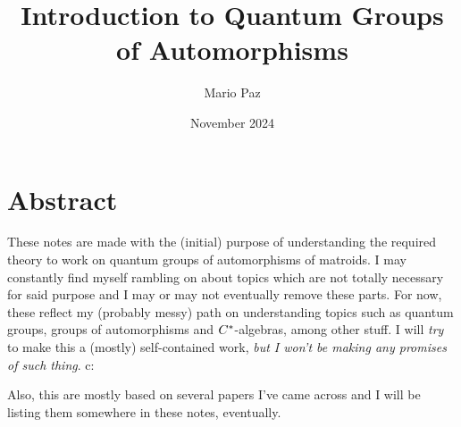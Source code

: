 \documentclass{book}
\title{Introduction to Quantum Groups of Automorphisms}
\author{Mario Paz}
\date{November 2024}
\begin{document}
\maketitle
\tableofcontents

\chapter*{Abstract}
These notes are made with the (initial) purpose of understanding the required theory to work on quantum groups of automorphisms of matroids. I may constantly find myself rambling on about topics which are not totally necessary for said purpose and I may or may not eventually remove these parts. For now, these reflect my (probably messy) path on understanding topics such as quantum groups, groups of automorphisms and $C^{*}$-algebras, among other stuff. I will \emph{try} to make this a (mostly) self-contained work, \emph{but I won't be making any promises of such thing}. c:

Also, this are mostly based on several papers I've came across and I will be listing them somewhere in these notes, eventually.


\end{document}
